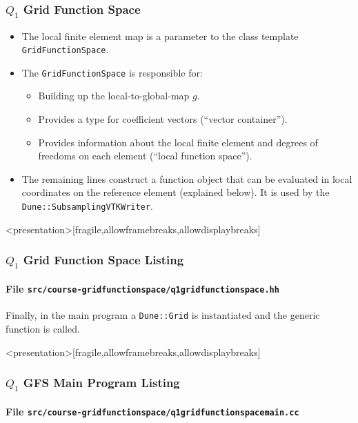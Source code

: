 \begin{frame}
\frametitle{$Q_1$ Grid Function Space}
\begin{itemize}
\item The local finite element map is a parameter to 
the class template \lstinline{GridFunctionSpace}.

\item The \lstinline{GridFunctionSpace} is responsible for:
\begin{itemize}
\item Building up the local-to-global-map $g$.
\item Provides a type for coefficient vectors (``vector container'').
\item Provides information about the local finite element and degrees of freedoms
on each element (``local function space'').
\end{itemize}

\item The remaining lines construct a function object that can be evaluated
in local coordinates on the reference element (explained below). It is used
by the \lstinline{Dune::SubsamplingVTKWriter}.
\end{itemize}
\end{frame}

\begin{frame}<presentation>[fragile,allowframebreaks,allowdisplaybreaks]
\frametitle<presentation>{$Q_1$ Grid Function Space Listing}
\framesubtitle<presentation>{File \texttt{src/course-gridfunctionspace/q1gridfunctionspace.hh}}

\end{frame}

Finally, in the main program a \lstinline{Dune::Grid} is instantiated
and the generic function is called.

\begin{frame}<presentation>[fragile,allowframebreaks,allowdisplaybreaks]
\frametitle<presentation>{$Q_1$ GFS Main Program Listing}
\framesubtitle<presentation>{File \texttt{src/course-gridfunctionspace/q1gridfunctionspacemain.cc}}

\end{frame}


